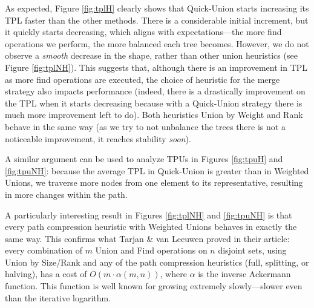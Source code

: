 As expected, Figure \ref{fig:tplH} clearly shows that Quick-Union starts increasing its TPL faster than the other methods. There is a considerable initial increment, but it quickly starts decreasing, which aligns with expectations—the more find operations we perform, the more balanced each tree becomes. However, we do not observe a \textit{smooth} decrease in the shape, rather than other union heuristics (see Figure \ref{fig:tplNH}). This suggests that, although there is an improvement in TPL as more find operations are executed, the choice of heuristic for the merge strategy also impacts performance (indeed, there is a drastically improvement on the TPL when it starts decreasing because with a Quick-Union strategy there is much more improvement left to do). Both heuristics Union by Weight and Rank behave in the same way (as we try to not unbalance the trees there is not a noticeable improvement, it reaches stability \textit{soon}).



A similar argument can be used to analyze TPUs in Figures \ref{fig:tpuH} and \ref{fig:tpuNH}: because the average TPL in Quick-Union is greater than in Weighted Unions, we traverse more nodes from one element to its representative, resulting in more changes within the path.

A particularly interesting result in Figures \ref{fig:tplNH} and \ref{fig:tpuNH} is that every path compression heuristic with Weighted Unions behaves in exactly the same way. This confirms what Tarjan \& van Leeuwen \cite{tarjan1984worst} proved in their article: every combination of $m$ Union and Find operations on $n$ disjoint sets, using Union by Size/Rank and any of the path compression heuristics (full, splitting, or halving), has a cost of $O(m \cdot \alpha(m,n))$, where $\alpha$ is the inverse Ackermann function. This function is well known for growing extremely slowly—slower even than the iterative logarithm.



